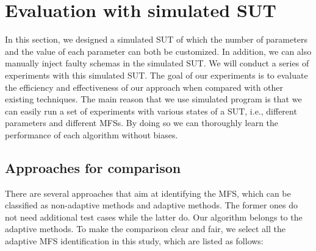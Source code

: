 \documentclass{sig-alternate-05-2015}
\begin{document}
{{{{\section{Evaluation with simulated SUT} \label{sec:simulateEx}
In this section, we designed a simulated SUT of which the number of parameters and the value of each parameter can both be customized. In addition, we can also manually inject faulty schemas in the simulated SUT. We will conduct a series of experiments with this simulated SUT. The goal of our experiments is to evaluate the efficiency and effectiveness of our approach when compared with other existing techniques. The main reason that we use simulated program is that we can easily run a set of experiments with various states of a SUT, i.e., different parameters and different MFSs. By doing so we can thoroughly learn the performance of each algorithm without biases.

\subsection{Approaches for comparison}
There are several approaches that aim at identifying the MFS, which can be classified as non-adaptive methods and adaptive methods. The former ones do not need additional test cases while the latter do. Our algorithm belongs to the adaptive methods. To make the comparison clear and fair, we select all the adaptive MFS identification in this study, which are listed as follows:

}}}}
\end{document}
